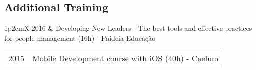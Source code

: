 \documentclass[a4paper, oneside, final]{scrartcl}
\newcommand{\vspc}{\vspace{0.15cm}} %
\newcommand{\vspcitem}{\vspace{0.1cm}} %
\begin{document}
\begin{center}




\section{Additional Training}
\begin{tabularx}{1\linewidth}{p{2cm}X}
2016       &  Developing New Leaders - The best tools and effective practices for people management (16h) - Paideia Educação \vspcitem\\
\end{tabularx}

\begin{tabularx}{1\linewidth}{p{2cm}X}
2015       & Mobile Development course with iOS (40h) - Caelum \vspcitem\\
\end{tabularx}


\end{center}
\end{document}
